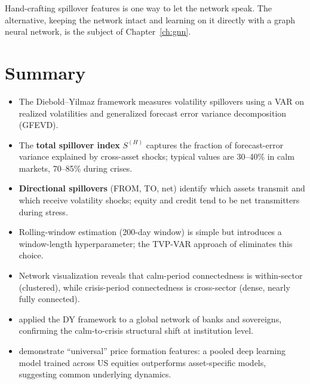 Hand-crafting spillover features is one way to let the network speak. The
alternative, keeping the network intact and learning on it directly with a
graph neural network, is the subject of Chapter~\ref{ch:gnn}.


\section{Summary}\label{sec:spillovers-summary}

\begin{itemize}[nosep]
  \item The Diebold--Yilmaz framework measures volatility spillovers using a VAR
        on realized volatilities and generalized forecast error variance
        decomposition (GFEVD).

  \item The \textbf{total spillover index} $S^{(H)}$ captures the fraction of
        forecast-error variance explained by cross-asset shocks; typical values are
        30--40\% in calm markets, 70--85\% during crises.

  \item \textbf{Directional spillovers} (FROM, TO, net) identify which assets
        transmit and which receive volatility shocks; equity and credit tend to be
        net transmitters during stress.

  \item Rolling-window estimation (200-day window) is simple but introduces a
        window-length hyperparameter; the TVP-VAR approach of
        \citet{AntonakakisChatziantoniouGabauer2020} eliminates this choice.

  \item Network visualization reveals that calm-period connectedness is within-sector
        (clustered), while crisis-period connectedness is cross-sector (dense, nearly
        fully connected).

  \item \citet{DemirerDieboldLiuYilmaz2018} applied the DY framework to a global
        network of banks and sovereigns, confirming the calm-to-crisis structural
        shift at institution level.

  \item \citet{SirignanoCont2019} demonstrate ``universal'' price formation features:
        a pooled deep learning model trained across US equities outperforms
        asset-specific models, suggesting common underlying dynamics.


\end{itemize}
